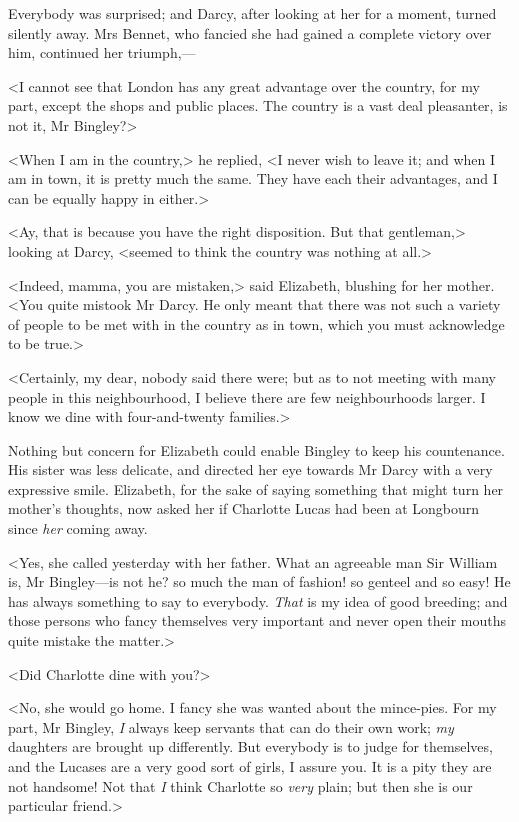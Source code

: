Everybody was surprised; and Darcy, after looking at her for a moment, turned silently away. Mrs Bennet, who fancied she had gained a complete victory over him, continued her triumph,—

<I cannot see that London has any great advantage over the country, for my part, except the shops and public places. The country is a vast deal pleasanter, is not it, Mr Bingley?>

<When I am in the country,> he replied, <I never wish to leave it; and when I am in town, it is pretty much the same. They have each their advantages, and I can be equally happy in either.>

<Ay, that is because you have the right disposition. But that gentleman,> looking at Darcy, <seemed to think the country was nothing at all.>

<Indeed, mamma, you are mistaken,> said Elizabeth, blushing for her mother. <You quite mistook Mr Darcy. He only meant that there was not such a variety of people to be met with in the country as in town, which you must acknowledge to be true.>

<Certainly, my dear, nobody said there were; but as to not meeting with many people in this neighbourhood, I believe there are few neighbourhoods larger. I know we dine with four-and-twenty families.>

Nothing but concern for Elizabeth could enable Bingley to keep his countenance. His sister was less delicate, and directed her eye towards Mr Darcy with a very expressive smile. Elizabeth, for the sake of saying something that might turn her mother's thoughts, now asked her if Charlotte Lucas had been at Longbourn since \textit{her} coming away.

<Yes, she called yesterday with her father. What an agreeable man Sir William is, Mr Bingley—is not he? so much the man of fashion! so genteel and so easy! He has always something to say to everybody. \textit{That} is my idea of good breeding; and those persons who fancy themselves very important and never open their mouths quite mistake the matter.>

<Did Charlotte dine with you?>

<No, she would go home. I fancy she was wanted about the mince-pies. For my part, Mr Bingley, \textit{I} always keep servants that can do their own work; \textit{my} daughters are brought up differently. But everybody is to judge for themselves, and the Lucases are a very good sort of girls, I assure you. It is a pity they are not handsome! Not that \textit{I} think Charlotte so \textit{very} plain; but then she is our particular friend.>

